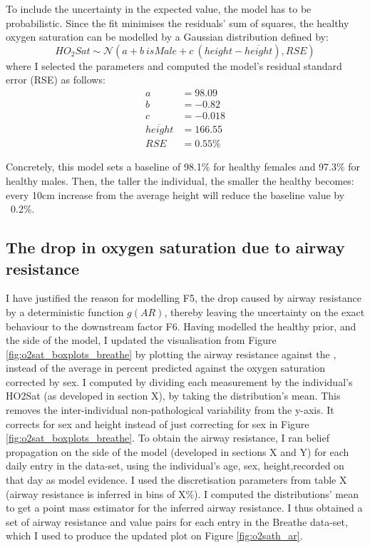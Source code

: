 To include the uncertainty in the expected value, the model has to be probabilistic. Since the fit minimises the residuals' sum of squares, the healthy oxygen saturation can be modelled by a Gaussian distribution defined by:
\begin{equation}
    H\!O_{2}Sat \sim \mathcal{N}(a + b\  isMale + c\ (height - \overline{height}),RSE)
\end{equation}
where I selected the parameters and computed the model's residual standard error (RSE) as follows:
\begin{align*}
a & = 98.09 \\
b & = -0.82 \\
c & = -0.018 \\
\overline{height} & = 166.55 \\
RSE & = 0.55\%
\end{align*}

Concretely, this model sets a baseline \OXSat of 98.1\% for healthy females and 97.3\% for healthy males. Then, the taller the individual, the smaller the healthy \OXSat becomes: every 10cm increase from the average height will reduce the baseline value by ~0.2\%.

\subsection{The drop in oxygen saturation due to airway resistance}

I have justified the reason for modelling F5, the drop caused by airway resistance by a deterministic function $g(AR)$, thereby leaving the uncertainty on the exact behaviour to the downstream factor F6. Having modelled the healthy prior, and the \F side of the model, I updated the visualisation from Figure \ref{fig:o2sat_boxplots_breathe} by plotting the airway resistance against the \OXSatPrct, instead of the average \F in percent predicted against the oxygen saturation corrected by sex. 
I computed \OXSatPrct by dividing each \OXSat measurement by the individual's HO2Sat (as developed in section X), by taking the distribution's mean. This removes the inter-individual non-pathological variability from the y-axis. It corrects for sex and height instead of just correcting for sex in Figure \ref{fig:o2sat_boxplots_breathe}.
To obtain the airway resistance, I ran belief propagation on the \F side of the model (developed in sections X and Y) for each daily entry in the data-set, using the individual's age, sex, height,\F recorded on that day as model evidence. I used the discretisation parameters from table X (airway resistance is inferred in bins of X\%). I computed the distributions' mean to get a point mass estimator for the inferred airway resistance. I thus obtained a set of airway resistance and \OXSatPrct value pairs for each entry in the Breathe data-set, which I used to produce the updated plot on Figure  \ref{fig:o2sath_ar}.

